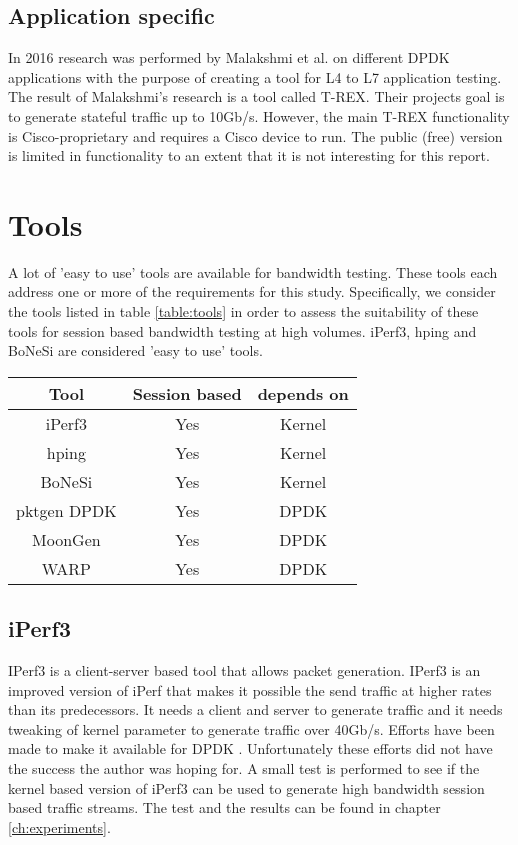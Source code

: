 \subsection{Application specific}
In 2016 research was performed by Malakshmi et al. \cite{mahalakshmi2016study} on different DPDK applications with the purpose of creating a tool for L4 to L7 application testing. 
The result of Malakshmi's research is a tool called T-REX. Their projects goal is to generate stateful traffic up to 10Gb/s. 
However, the main T-REX functionality is Cisco-proprietary and requires a Cisco device to run. The public (free) version is limited in functionality to an extent that it is not interesting for this report.
\section{Tools}\label{sec:tools}
A lot of 'easy to use' tools are available for bandwidth testing. 
These tools each address one or more of the requirements for this study.
Specifically, we consider the tools listed in table \ref{table:tools} in order to assess the suitability of these tools for session based bandwidth testing at high volumes.
iPerf3, hping and BoNeSi are considered 'easy to use' tools.

\begin{table*}[ht]
\centering
\begin{tabular}{|c|c|c|} \hline
\textbf{Tool} & \textbf{Session based} & \textbf{depends on} \\ \hline
iPerf3\cite{iperf} & Yes & Kernel  \\ \hline
hping\cite{hping}  & Yes & Kernel \\ \hline
BoNeSi\cite{bonesi} & Yes & Kernel \\ \hline
pktgen DPDK\cite{pktgen-dpdk} & Yes & DPDK \\ \hline
MoonGen\cite{moongen} & Yes & DPDK \\ \hline
WARP\cite{warp} & Yes & DPDK \\ \hline
\end{tabular}
\caption{Packet generation tools}
\label{table:tools}
\end{table*} 

\subsection{iPerf3}\label{sub:iperf3}
IPerf3 is a client-server based tool that allows packet generation.
IPerf3 is an improved version of iPerf that makes it possible the send traffic at higher rates than its predecessors. It needs a client and server to generate traffic and it needs tweaking of kernel parameter to generate traffic over 40Gb/s. Efforts have been made to make it available for DPDK \cite{jelte}. Unfortunately these efforts did not have the success the author was hoping for. 
A small test is performed to see if the kernel based version of iPerf3 can be used to generate high bandwidth session based traffic streams. The test and the results can be found in chapter \ref{ch:experiments}.

